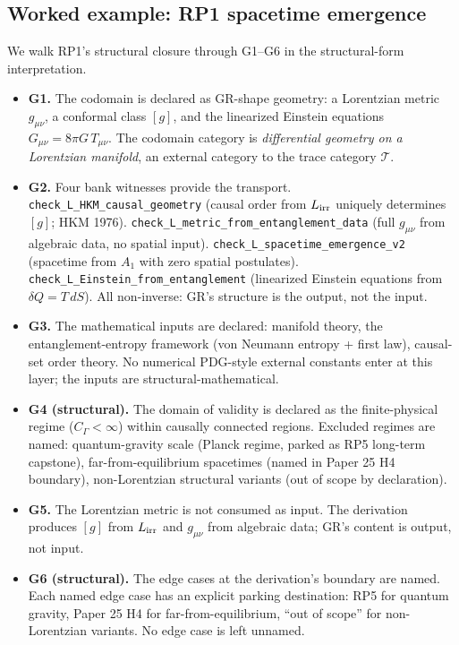 \subsection{Worked example: RP1 spacetime emergence}
\label{subsec:rp1-walk}

We walk RP1's structural closure through G1--G6 in the structural-form interpretation.

\begin{itemize}
\item \textbf{G1.} The codomain is declared as GR-shape geometry: a Lorentzian metric $g_{\mu\nu}$, a conformal class $[g]$, and the linearized Einstein equations $G_{\mu\nu} = 8\pi G\, T_{\mu\nu}$. The codomain category is \emph{differential geometry on a Lorentzian manifold}, an external category to the trace category $\mathcal{T}$.
\item \textbf{G2.} Four bank witnesses provide the transport. \texttt{check\_L\_HKM\_causal\_geometry} (causal order from $L_{\rm irr}$ uniquely determines $[g]$; HKM 1976). \texttt{check\_L\_metric\_from\_entanglement\_data} (full $g_{\mu\nu}$ from algebraic data, no spatial input). \texttt{check\_L\_spacetime\_emergence\_v2} (spacetime from $A_1$ with zero spatial postulates). \texttt{check\_L\_Einstein\_from\_entanglement} (linearized Einstein equations from $\delta Q = T\, dS$). All non-inverse: GR's structure is the output, not the input.
\item \textbf{G3.} The mathematical inputs are declared: manifold theory, the entanglement-entropy framework (von Neumann entropy + first law), causal-set order theory. No numerical PDG-style external constants enter at this layer; the inputs are structural-mathematical.
\item \textbf{G4 (structural).} The domain of validity is declared as the finite-physical regime ($C_\Gamma < \infty$) within causally connected regions. Excluded regimes are named: quantum-gravity scale (Planck regime, parked as RP5 long-term capstone), far-from-equilibrium spacetimes (named in Paper 25 H4 boundary), non-Lorentzian structural variants (out of scope by declaration).
\item \textbf{G5.} The Lorentzian metric is not consumed as input. The derivation produces $[g]$ from $L_{\rm irr}$ and $g_{\mu\nu}$ from algebraic data; GR's content is output, not input.
\item \textbf{G6 (structural).} The edge cases at the derivation's boundary are named. Each named edge case has an explicit parking destination: RP5 for quantum gravity, Paper 25 H4 for far-from-equilibrium, ``out of scope'' for non-Lorentzian variants. No edge case is left unnamed.
\end{itemize}


